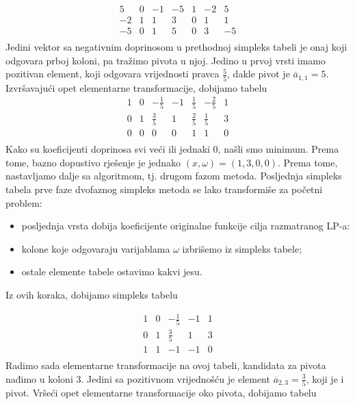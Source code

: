\documentclass[a4paper, utf8, 11pt, colorlinks]{article}
\begin{document}
$$ \begin{array}{cccccc|c}
 	 5 & 0 & -1 & -5 & 1 & -2 & 5 \\
	-2&1  & 1 & 3 & 0 & 1 & 1 \\ \hline
	 -5 & 0 & 1 & 5 & 0 & 3 & -5 \\
 \end{array}
 $$
 Jedini vektor sa negativnim doprinosom u prethodnoj simpleks tabeli je 
 onaj koji odgovara prboj koloni, pa tražimo pivota u njoj. 
 Jedino u prvoj vrsti imamo pozitivan element, koji odgovara vrijednosti pravca $\frac{5}{5}$, dakle pivot je $\overline{a}_{1,1}=5$. Izvršavajući opet elementarne transformacije, dobijamo tabelu 
 $$ \begin{array}{cccccc|c}
        1 & 0 & -\frac{1}{5}  & -1   &  \frac{1}{5}     & -\frac{2}{5}  & 1                    \\
        0 & 1 & \frac{3}{5}   &  1   &   \frac{2}{5}  & \frac{1}{5}      & 3                   \\ \hline
        0 & 0 & 0            &  0   &   1        & 1                     & 0                                 \\
    \end{array}
$$
Kako su koeficijenti doprinosa svi veći ili jednaki 0, našli smo minimum. 
Prema tome, bazno dopustivo rješenje je jednako $(x, \omega)= (1,3, 0, 0)$. Prema tome, nastavljamo dalje sa algoritmom, tj. drugom fazom metoda.  Posljednja simpleks tabela prve faze dvofaznog simpleks metoda se lako transformiše za početni problem: 
\begin{itemize}
	\item posljednja vrsta dobija koeficijente originalne funkcije cilja razmatranog LP-a:
	\item kolone koje odgovaraju varijablama $\omega$ izbrišemo iz simpleks tabele;
	\item ostale elemente tabele ostavimo kakvi jesu.
\end{itemize}
Iz ovih koraka, dobijamo simpleks tabelu 

 $$ \begin{array}{cccc|c}
 	   1 & 0 & -\frac{1}{5}     & -1   & 1 \\
 	   0 & 1 & \frac{3}{5}      & 1    & 3 \\ \hline
       1 & 1 & -1               & -1   & 0 \\
    \end{array}
$$
Radimo sada elementarne transformacije na ovoj tabeli, kandidata za pivota nađimo u 
koloni 3. Jedini sa pozitivnom vrijednošću je element $\overline{a}_{2,3} = \frac{3}{5}$, koji je i pivot. 
Vršeći opet elementarne transformacije oko pivota, dobijamo tabelu 
\end{document}
